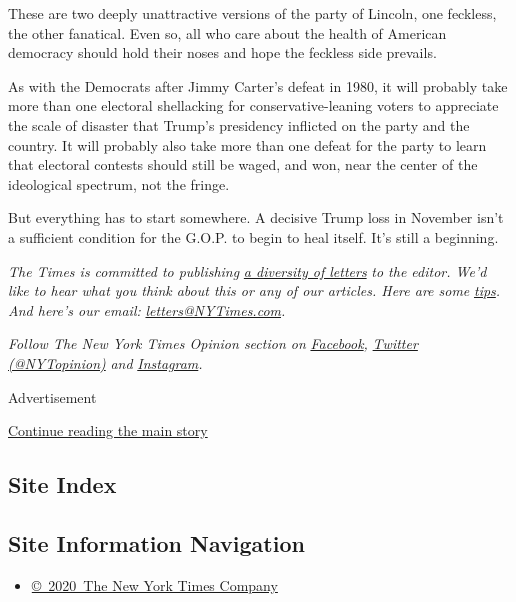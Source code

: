 These are two deeply unattractive versions of the party of Lincoln, one
feckless, the other fanatical. Even so, all who care about the health of
American democracy should hold their noses and hope the feckless side
prevails.

As with the Democrats after Jimmy Carter's defeat in 1980, it will
probably take more than one electoral shellacking for
conservative-leaning voters to appreciate the scale of disaster that
Trump's presidency inflicted on the party and the country. It will
probably also take more than one defeat for the party to learn that
electoral contests should still be waged, and won, near the center of
the ideological spectrum, not the fringe.

But everything has to start somewhere. A decisive Trump loss in November
isn't a sufficient condition for the G.O.P. to begin to heal itself.
It's still a beginning.

\emph{The Times is committed to publishing}
\href{https://www.nytimes3xbfgragh.onion/2019/01/31/opinion/letters/letters-to-editor-new-york-times-women.html}{\emph{a
diversity of letters}} \emph{to the editor. We'd like to hear what you
think about this or any of our articles. Here are some}
\href{https://help.nytimes3xbfgragh.onion/hc/en-us/articles/115014925288-How-to-submit-a-letter-to-the-editor}{\emph{tips}}\emph{.
And here's our email:}
\href{mailto:letters@NYTimes.com}{\emph{letters@NYTimes.com}}\emph{.}

\emph{Follow The New York Times Opinion section on}
\href{https://www.facebookcorewwwi.onion/nytopinion}{\emph{Facebook}}\emph{,}
\href{http://twitter.com/NYTOpinion}{\emph{Twitter (@NYTopinion)}}
\emph{and}
\href{https://www.instagram.com/nytopinion/}{\emph{Instagram}}\emph{.}

Advertisement

\protect\hyperlink{after-bottom}{Continue reading the main story}

\hypertarget{site-index}{%
\subsection{Site Index}\label{site-index}}

\hypertarget{site-information-navigation}{%
\subsection{Site Information
Navigation}\label{site-information-navigation}}

\begin{itemize}
\tightlist
\item
  \href{https://help.nytimes3xbfgragh.onion/hc/en-us/articles/115014792127-Copyright-notice}{©~2020~The
  New York Times Company}
\end{itemize}

